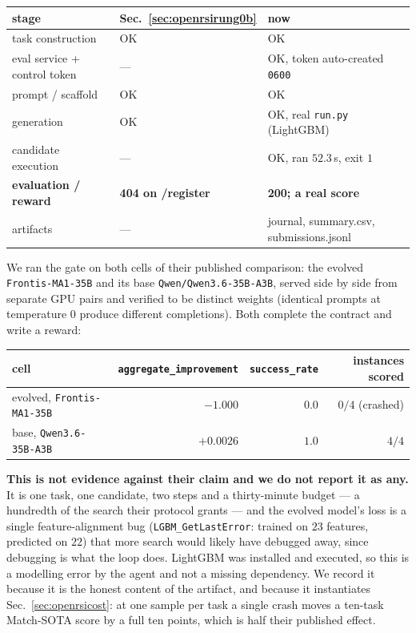 \begin{center}
\begin{tabular}{lll}
\toprule
stage & Sec.~\ref{sec:openrsirung0b} & now \\
\midrule
task construction & OK & OK \\
eval service + control token & --- & OK, token auto-created \texttt{0600} \\
prompt / scaffold & OK & OK \\
generation & OK & OK, real \texttt{run.py} (LightGBM) \\
candidate execution & --- & OK, ran $52.3$\,s, exit $1$ \\
\textbf{evaluation / reward} & \textbf{404 on /register} & \textbf{200; a real score} \\
artifacts & --- & journal, summary.csv, submissions.jsonl \\
\bottomrule
\end{tabular}
\end{center}

We ran the gate on both cells of their published comparison: the evolved
\texttt{Frontis-MA1-35B} and its base \texttt{Qwen/Qwen3.6-35B-A3B}, served side by side from
separate GPU pairs and verified to be distinct weights (identical prompts at temperature $0$
produce different completions). Both complete the contract and write a reward:

\begin{center}
\begin{tabular}{lrrr}
\toprule
cell & \texttt{aggregate\_improvement} & \texttt{success\_rate} & instances scored \\
\midrule
evolved, \texttt{Frontis-MA1-35B} & $-1.000$ & $0.0$ & $0/4$ (crashed) \\
base, \texttt{Qwen3.6-35B-A3B} & $+0.0026$ & $1.0$ & $4/4$ \\
\bottomrule
\end{tabular}
\end{center}

\textbf{This is not evidence against their claim and we do not report it as any.} It is one
task, one candidate, two steps and a thirty-minute budget --- a hundredth of the search their
protocol grants --- and the evolved model's loss is a single feature-alignment bug
(\texttt{LGBM\_GetLastError}: trained on $23$ features, predicted on $22$) that more search
would likely have debugged away, since debugging is what the loop does. LightGBM was installed
and executed, so this is a modelling error by the agent and not a missing dependency. We
record it because it is the honest content of the artifact, and because it instantiates
Sec.~\ref{sec:openrsicost}: at one sample per task a single crash moves a ten-task Match-SOTA
score by a full ten points, which is half their published effect.

